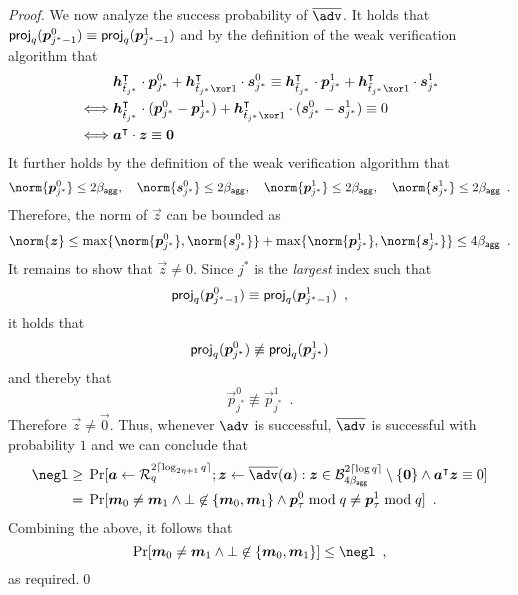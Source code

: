 \begin{proof}
  We now analyze the success probability of $\sisadv$.
  It holds that $\mathsf{proj}_q(\boldsymbol{p}_{j^*-1}^0) \equiv \mathsf{proj}_q(\boldsymbol{p}_{j^*-1}^1)$ and by the definition of the weak verification algorithm that
  \begin{align*}
    &\vec{h}_{\tilde t_{j^*}}^\transpose\cdot\vec{p}_{j^*}^0 + \vec{h}_{\tilde t_{j^*}\xor 1}^\transpose\cdot\vec{s}_{j^*}^0 \equiv \vec{h}_{\tilde t_{j^*}}^\transpose\cdot\vec{p}_{j^*}^1 + \vec{h}_{\tilde t_{j^*}\xor 1}^\transpose\cdot\vec{s}_{j^*}^1\\
    \iff&\vec{h}_{\tilde t_{j^*}}^\transpose\cdot(\vec{p}_{j^*}^0-\vec{p}_{j^*}^1) + \vec{h}_{\tilde t_{j^*}\xor 1}^\transpose\cdot(\vec{s}_{j^*}^0-\vec{s}_{j^*}^1) \equiv 0\\
    \iff&\vec{a}^\transpose\cdot\vec{z}\equiv\vec{0} 
  \end{align*}
  It further holds by the definition of the weak verification algorithm that 
  \[
  \norm{\vec{p}_{j^*}^0} \leq 2\bagg,\quad \norm{\vec{s}_{j^*}^0} \leq 2\bagg, \quad\norm{\vec{p}_{j^*}^1} \leq 2\bagg, \quad \norm{\vec{s}_{j^*}^1} \leq 2\bagg\enspace.
  \]
  Therefore, the norm of $\vec{z}$ can be bounded as
  \[
  \norm{\vec{z}} \leq \max\{\norm{\vec{p}_{j^*}^0},\norm{\vec{s}_{j^*}^0}\}+\max\{\norm{\vec{p}_{j^*}^1},\norm{\vec{s}_{j^*}^1}\} \leq 4\bagg\enspace.
  \]
  It remains to show that $\vec{z}\neq 0$.
  Since $j^*$ is the \emph{largest} index such that 
  \[
    \mathsf{proj}_q(\boldsymbol{p}_{j^*-1}^0) \equiv \mathsf{proj}_q(\boldsymbol{p}_{j^*-1}^1)\enspace,
  \]
  it holds that
  \[
    \mathsf{proj}_q(\boldsymbol{p}_{j^*}^0) \not \equiv \mathsf{proj}_q(\boldsymbol{p}_{j^*}^1)
  \]
  and thereby that
  \[
    \vec{p}_{j^*}^0 \not \equiv \vec{p}_{j^*}^1\enspace.
  \]
  Therefore $\vec{z}\neq\vec{0}$.
  Thus, whenever $\adv$ is successful, $\sisadv$ is successful with probability $1$ and we can conclude that
  \begin{align*}
  \negl \geq{}& \Pr[
      \vec{a} \gets \ring_q^{2\lceil\log_{2\eta+1} q\rceil}; \vec{z}\gets\sisadv(\vec{a}) : \vec{z}\in\ball_{4\bagg}^{2\lceil\log q\rceil}\setminus\{\vec{0}\} \land \vec{a}^\transpose\vec{z}\equiv 0
    ]\\
    ={}&
    \Pr[\vec{m}_0\neq \vec{m}_1 \land \bot\not\in\{\vec{m}_0,\vec{m}_1\} \land \vec{p}_\tau^0 \bmod q\neq \vec{p}_\tau^1\bmod q]\enspace.
  \end{align*}
  Combining the above, it follows that
  \[
    \Pr[\vec{m}_0\neq \vec{m}_1 \land \bot\not\in\{\vec{m}_0,\vec{m}_1\}] \leq \negl\enspace,
  \]
  as required.\qed
\end{proof}
